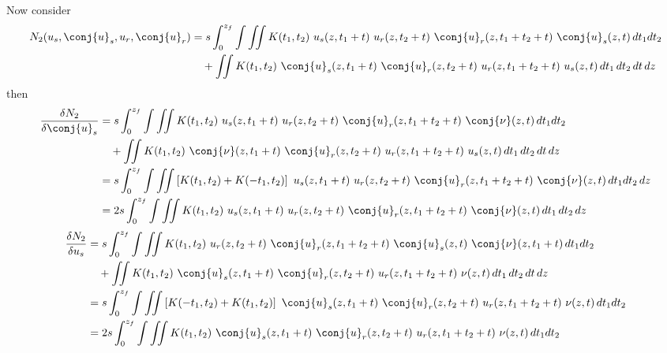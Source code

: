 Now consider
\begin{equation}\label{equ:Nonlinear_Term_2_Functional}
\begin{split}
N_2(u_s,\conj{u}_s,u_r,\conj{u}_r) &=  s \int_{0}^{z_f} \int \iint K(t_1,t_2)\ u_s(z,t_1+t) \ u_r(z,t_2+t) \ \conj{u}_r(z,t_1+t_2+t) \ \conj{u}_s(z,t)   \,dt_1 dt_2 \\
&\quad + \iint K(t_1,t_2) \ \conj{u}_s(z,t_1+t) \ \conj{u}_r(z,t_2+t) \ u_r(z,t_1+t_2+t) \ u_s(z,t) \,dt_1\, dt_2 \,dt \, dz  \\
\end{split}
\end{equation}
then 
\begin{equation}
\begin{split}
\frac{\delta N_2}{\delta \conj{u}_s} &=  s \int_{0}^{z_f} \int \iint K(t_1,t_2) \ u_s(z,t_1+t) \ u_r(z,t_2+t) \ \conj{u}_r(z,t_1+t_2+t) \ \conj{\nu}(z,t)   \,dt_1 dt_2 \\
&\quad +  \iint K(t_1,t_2) \ \conj{\nu}(z,t_1+t) \  \conj{u}_r(z,t_2+t) \ u_r(z,t_1+t_2+t) \  u_s(z,t)   \,dt_1\, dt_2 \,dt \, dz  \\
&= s\int_{0}^{z_f} \int \iint \left[ K(t_1,t_2) + K(-t_1,t_2)\right] \ u_s(z,t_1+t) \ u_r(z,t_2+t) \  \conj{u}_r(z,t_1+t_2+t)\  \conj{\nu}(z,t)   \,dt_1 dt_2 \, dz\\
&= 2s  \int_{0}^{z_f} \int  \iint K(t_1,t_2) \ u_s(z,t_1+t) \ u_r(z,t_2+t) \  \conj{u}_r(z,t_1+t_2+t) \  \conj{\nu}(z,t)   \,dt_1 \, dt_2 \, dz\\
\end{split}
\end{equation}
\begin{equation}
\begin{split}
\frac{\delta N_2}{\delta u_s} &= s \int_{0}^{z_f} \int \iint K(t_1,t_2)\ u_r(z,t_2+t)\ \conj{u}_r(z,t_1+t_2+t)\ \conj{u}_s(z,t) \  \conj{\nu}(z,t_1+t) \,dt_1 dt_2 \\
&\quad + \iint  K(t_1,t_2)\ \conj{u}_s(z,t_1+t)\ \conj{u}_r(z,t_2+t)\ u_r(z,t_1+t_2+t)\ \nu(z,t)   \,dt_1\, dt_2 \,dt \, dz  \\
&= s \int_{0}^{z_f} \int \iint \left[ K(-t_1,t_2)+K(t_1,t_2) \right]\ \conj{u}_s(z,t_1+t)\ \conj{u}_r(z,t_2+t)\ u_r(z,t_1+t_2+t)\ \nu(z,t) \,dt_1 dt_2 \\
&= 2s \int_{0}^{z_f} \int  \iint K(t_1,t_2) \ \conj{u}_s(z,t_1+t)\ \conj{u}_r(z,t_2+t)\ u_r(z,t_1+t_2+t)\ \nu(z,t) \,dt_1 dt_2 \\
\end{split}
\end{equation}
